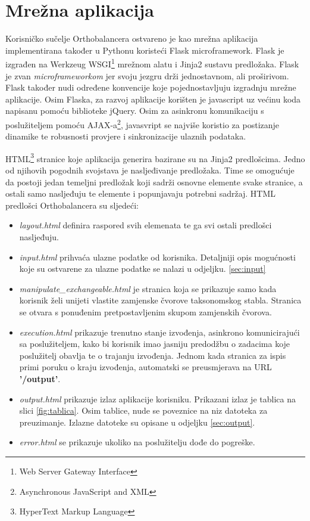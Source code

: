 \chapter{Mrežna aplikacija}
\label{chap:server}

Korisničko sučelje Orthobalancera ostvareno je kao mrežna aplikacija
implementirana također u Pythonu koristeći Flask microframework. Flask je
izgrađen na Werkzeug WSGI\footnote{Web Server Gateway Interface\cite{pep333}}
mrežnom alatu i Jinja2 sustavu predložaka. Flask je zvan \emph{microframeworkom}
jer svoju jezgru drži jednostavnom, ali proširivom. Flask također nudi određene
konvencije koje pojednostavljuju izgradnju mrežne aplikacije. Osim Flaska, za
razvoj aplikacije korišten je javascript uz većinu koda napisanu pomoću
biblioteke jQuery. Osim za asinkronu komunikaciju s poslužiteljem pomoću
AJAX-a\footnote{Asynchronous JavaScript and XML}, javasvript se najviše koristio
za postizanje dinamike te robusnosti provjere i sinkronizacije ulaznih podataka.

HTML\footnote{HyperText Markup Language} stranice koje aplikacija generira
bazirane su na Jinja2 predlošcima. Jedno od njihovih pogodnih svojstava je
nasljeđivanje predložaka. Time se omogućuje da postoji jedan temeljni predložak
koji sadrži osnovne elemente svake stranice, a ostali samo nasljeđuju te
elemente i popunjavaju potrebni sadržaj. HTML predlošci Orthobalancera su
sljedeći:

\begin{itemize}

    \item \emph{layout.html} definira raspored svih elemenata te ga svi ostali
predlošci nasljeđuju.

    \item \emph{input.html} prihvaća ulazne podatke od korisnika. Detaljniji
opis mogućnosti koje su ostvarene za ulazne podatke se nalazi u odjeljku.
\ref{sec:input}

    \item \emph{manipulate\_exchangeable.html} je stranica koja se prikazuje
samo kada korisnik želi unijeti vlastite zamjenske čvorove taksonomskog stabla.
Stranica se otvara s ponuđenim pretpostavljenim skupom zamjenskih čvorova.

    \item \emph{execution.html}  prikazuje trenutno stanje izvođenja, asinkrono
komunicirajući sa poslužiteljem, kako bi korisnik imao jasniju predodžbu o
zadacima koje poslužitelj obavlja te o trajanju izvođenja. Jednom kada stranica
za ispis primi poruku o kraju izvođenja, automatski se preusmjerava na URL
\textbf{'/output'}.

    \item \emph{output.html} prikazuje izlaz aplikacije korisniku. Prikazani
izlaz je tablica na slici \ref{fig:tablica}. Osim tablice, nude se poveznice na
niz datoteka za preuzimanje. Izlazne datoteke su opisane u odjeljku
\ref{sec:output}.

    \item \emph{error.html} se prikazuje ukoliko na poslužitelju dođe do
pogreške.

\end{itemize}

